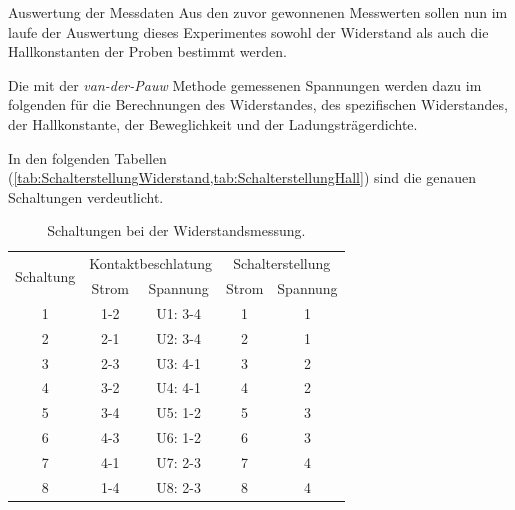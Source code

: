 \documentclass[pdftex, a4paper,11pt, twoside, ngerman]{report}
\begin{document}
  \begin{chapter}{Auswertung der Messdaten}
    \label{chp:Auswertung}
    Aus den zuvor gewonnenen Messwerten sollen nun im laufe der Auswertung
    dieses Experimentes sowohl der Widerstand als auch die Hallkonstanten der
    Proben bestimmt werden.
    
    Die mit der \textit{van-der-Pauw} Methode gemessenen Spannungen werden dazu
    im folgenden für die Berechnungen des Widerstandes, des spezifischen
    Widerstandes, der Hallkonstante, der Beweglichkeit und der
    Ladungsträgerdichte.
    
    In den folgenden Tabellen
    (\cref{tab:SchalterstellungWiderstand,tab:SchalterstellungHall}) sind die
    genauen Schaltungen verdeutlicht.
    \begin{table}[htbp]
      \centering
      \footnotesize
      \begin{tabular}{c|c|c|c|c}
        \multirow{2}{*}{Schaltung} & \multicolumn{2}{c|}{Kontaktbeschlatung}
        & \multicolumn{2}{c}{Schalterstellung}\\
        & Strom & Spannung & Strom & Spannung \\ \hline \hline
        1 & 1-2 & U1: 3-4 & 1 & 1 \\
        2 & 2-1 & U2: 3-4 & 2 & 1 \\
        3 & 2-3 & U3: 4-1 & 3 & 2 \\
        4 & 3-2 & U4: 4-1 & 4 & 2 \\
        5 & 3-4 & U5: 1-2 & 5 & 3 \\
        6 & 4-3 & U6: 1-2 & 6 & 3 \\
        7 & 4-1 & U7: 2-3 & 7 & 4 \\
        8 & 1-4 & U8: 2-3 & 8 & 4 \\
      \end{tabular}
      \caption{Schaltungen bei der Widerstandsmessung.}
      \label{tab:SchalterstellungWiderstand}
    \end{table}


\end{chapter}
\end{document}
